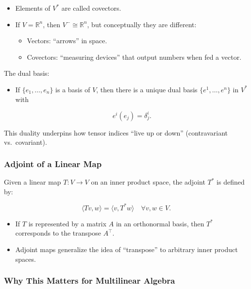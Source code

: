 \documentclass[
  letterpaper,
  DIV=11,
  numbers=noendperiod]{scrreprt}
\providecommand{\tightlist}{%
  \setlength{\itemsep}{0pt}\setlength{\parskip}{0pt}}
\begin{document}
\begin{itemize}
\item
  Elements of \(V^*\) are called covectors.
\item
  If \(V=\mathbb{R}^n\), then \(V^- \cong \mathbb{R}^n\), but
  conceptually they are different:

  \begin{itemize}
  \tightlist
  \item
    Vectors: ``arrows'' in space.
  \item
    Covectors: ``measuring devices'' that output numbers when fed a
    vector.
  \end{itemize}
\end{itemize}

The dual basis:

\begin{itemize}
\item
  If \(\{e_1,\dots,e_n\}\) is a basis of \(V\), then there is a unique
  dual basis \(\{e^1,\dots,e^n\}\) in \(V^*\) with

  \[
  e^i(e_j) = \delta^i_j.
  \]
\end{itemize}

This duality underpins how tensor indices ``live up or down''
(contravariant vs.~covariant).

\subsubsection{Adjoint of a Linear Map}\label{adjoint-of-a-linear-map}

Given a linear map \(T: V \to V\) on an inner product space, the adjoint
\(T^*\) is defined by:

\[
\langle Tv, w \rangle = \langle v, T^*w \rangle \quad \forall v,w \in V.
\]

\begin{itemize}
\tightlist
\item
  If \(T\) is represented by a matrix \(A\) in an orthonormal basis,
  then \(T^*\) corresponds to the transpose \(A^\top\).
\item
  Adjoint maps generalize the idea of ``transpose'' to arbitrary inner
  product spaces.
\end{itemize}

\subsubsection{Why This Matters for Multilinear
Algebra}\label{why-this-matters-for-multilinear-algebra-2}
\end{document}
